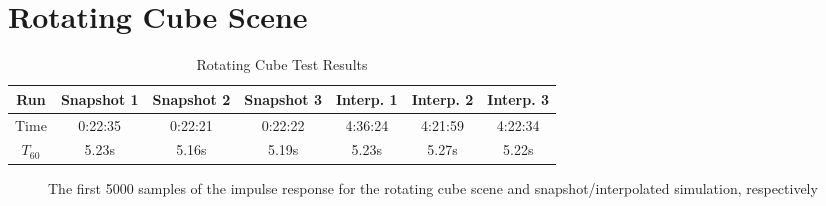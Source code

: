 \section{Rotating Cube Scene}

\begin{table}[t!]
    \centering
    \begin{tabular}{| c | c | c | c | c | c | c |}
        \hline
        Run        & Snapshot 1 & Snapshot 2 & Snapshot 3 & Interp. 1 & Interp. 2 & Interp. 3 \\
        \hline
        Time       & 0:22:35    & 0:22:21    & 0:22:22    & 4:36:24   & 4:21:59   & 4:22:34   \\
        \hline
        \(T_{60}\) & 5.23s      & 5.16s      & 5.19s      & 5.23s     & 5.27s     & 5.22s     \\
        \hline
    \end{tabular}
    \caption{Rotating Cube Test Results}\label{tbl:CubeSceneTable}
\end{table}

\begin{figure}[t!]
    \begin{center}
        
    \end{center}
    \caption{The first 5000 samples of the impulse response for the rotating cube scene and snapshot/interpolated simulation, respectively}\label{fig:CubeSceneIR}
\end{figure}

